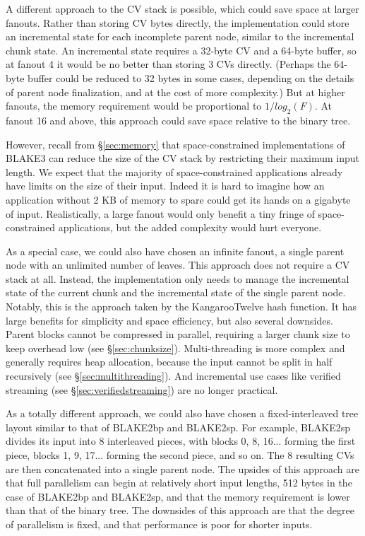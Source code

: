 \documentclass[11pt,notitlepage,a4paper]{article}
\begin{document}
A different approach to the CV stack is possible, which could save space at
larger fanouts. Rather than storing CV bytes directly, the implementation could
store an incremental state for each incomplete parent node, similar to the
incremental chunk state. An incremental state requires a 32-byte CV and a
64-byte buffer, so at fanout 4 it would be no better than storing 3 CVs
directly. (Perhaps the 64-byte buffer could be reduced to 32 bytes in some
cases, depending on the details of parent node finalization, and at the cost of
more complexity.) But at higher fanouts, the memory requirement would be
proportional to $1/log_2(F)$. At fanout 16 and above, this approach could save
space relative to the binary tree.

However, recall from \S\ref{sec:memory} that space-constrained implementations
of BLAKE3 can reduce the size of the CV stack by restricting their maximum
input length. We expect that the majority of space-constrained applications
already have limits on the size of their input. Indeed it is hard to imagine
how an application without 2 KB of memory to spare could get its hands on a
gigabyte of input. Realistically, a large fanout would only benefit a tiny
fringe of space-constrained applications, but the added complexity would hurt
everyone.

As a special case, we could also have chosen an infinite fanout, a single
parent node with an unlimited number of leaves. This approach does not require
a CV stack at all. Instead, the implementation only needs to manage the
incremental state of the current chunk and the incremental state of the single
parent node. Notably, this is the approach taken by the KangarooTwelve hash
function. It has large benefits for simplicity and space efficiency, but also
several downsides. Parent blocks cannot be compressed in parallel, requiring a
larger chunk size to keep overhead low (see \S\ref{sec:chunksize}).
Multi-threading is more complex and generally requires heap allocation, because
the input cannot be split in half recursively (see \S\ref{sec:multithreading}).
And incremental use cases like verified streaming (see
\S\ref{sec:verifiedstreaming}) are no longer practical.

As a totally different approach, we could also have chosen a fixed-interleaved
tree layout similar to that of BLAKE2bp and BLAKE2sp. For example, BLAKE2sp
divides its input into 8 interleaved pieces, with blocks 0, 8, 16... forming
the first piece, blocks 1, 9, 17... forming the second piece, and so on. The 8
resulting CVs are then concatenated into a single parent node. The upsides of
this approach are that full parallelism can begin at relatively short input
lengths, 512 bytes in the case of BLAKE2bp and BLAKE2sp, and that the memory
requirement is lower than that of the binary tree. The downsides of this
approach are that the degree of parallelism is fixed, and that performance is
poor for shorter inputs.
\end{document}

